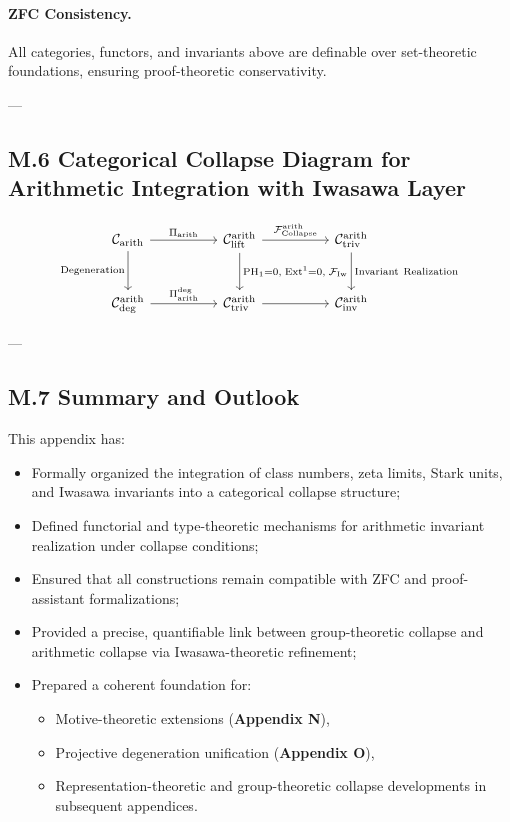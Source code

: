 \documentclass[11pt]{article}
\begin{document}
\paragraph{ZFC Consistency.}
All categories, functors, and invariants above are definable over set-theoretic foundations, ensuring proof-theoretic conservativity.

---

\subsection*{M.6 Categorical Collapse Diagram for Arithmetic Integration with Iwasawa Layer}

\[
\begin{tikzcd}[column sep=huge, row sep=large]
\mathcal{C}_{\mathrm{arith}} \arrow[r, "{\Pi_{\mathrm{arith}}}"] \arrow[d, "{\mathrm{Degeneration}}"']
& \mathcal{C}_{\mathrm{lift}}^{\mathrm{arith}} \arrow[r, "{\mathcal{F}_{\mathrm{Collapse}}^{\mathrm{arith}}}"] \arrow[d, "{\mathrm{PH}_1 = 0,\; \mathrm{Ext}^1 = 0,\; \mathcal{F}_{\mathrm{Iw}}}"]
& \mathcal{C}_{\mathrm{triv}}^{\mathrm{arith}} \arrow[d, "{\mathrm{Invariant\ Realization}}"] \\
\mathcal{C}_{\mathrm{deg}}^{\mathrm{arith}} \arrow[r, "{\Pi_{\mathrm{arith}}^{\mathrm{deg}}}"]
& \mathcal{C}_{\mathrm{triv}}^{\mathrm{arith}} \arrow[r]
& \mathcal{C}_{\mathrm{inv}}^{\mathrm{arith}}
\end{tikzcd}
\]

---

\subsection*{M.7 Summary and Outlook}

This appendix has:
\begin{itemize}
  \item Formally organized the integration of class numbers, zeta limits, Stark units, and Iwasawa invariants into a categorical collapse structure;
  \item Defined functorial and type-theoretic mechanisms for arithmetic invariant realization under collapse conditions;
  \item Ensured that all constructions remain compatible with ZFC and proof-assistant formalizations;
  \item Provided a precise, quantifiable link between group-theoretic collapse and arithmetic collapse via Iwasawa-theoretic refinement;
  \item Prepared a coherent foundation for:
  \begin{itemize}
    \item Motive-theoretic extensions (\textbf{Appendix N}),
    \item Projective degeneration unification (\textbf{Appendix O}),
    \item Representation-theoretic and group-theoretic collapse developments in subsequent appendices.
  \end{itemize}
\end{itemize}
\end{document}
